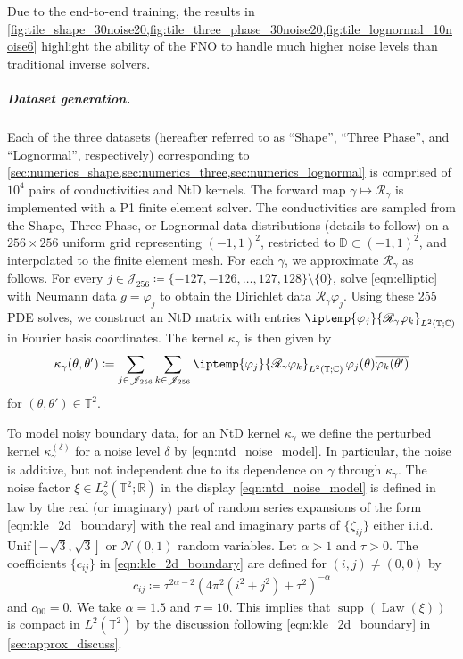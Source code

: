 \documentclass[pdflatex,sn-mathphys-num]{sn-jnl-preprint}
\newcommand{\R}{\mathbb{R}}
\newcommand{\T}{\mathbb{T}}
\newcommand{\C}{\mathbb{C}}
\newcommand{\D}{\mathbb{D}}
\newcommand{\sJ}{\mathscr{J}}
\newcommand{\ntd}{\mathscr{R}_{\gamma}}
\newcommand{\ip}{\iptemp}
\newcommand{\defeq}{\coloneqq} %
\newcommand{\Law}{\operatorname{Law}} %
\newcommand{\normal}{\mathcal{N}} %
\newcommand{\Unif}{\mathrm{Unif}}
\DeclareMathOperator{\supp}{supp} %
\newcommand{\al}{\alpha}
\theoremstyle{thmstyleone}%
\theoremstyle{thmstyletwo}%
\theoremstyle{thmstylethree}%
\numberwithin{equation}{section}
\numberwithin{theorem}{section}
\begin{document}
\begin{appendices}
Due to the end-to-end training, the results in \cref{fig:tile_shape_30noise20,fig:tile_three_phase_30noise20,fig:tile_lognormal_10noise6} highlight the ability of the FNO to handle much higher noise levels than traditional inverse solvers.

\subparagraph*{\emph{\textbf{Dataset generation.}}}
Each of the three datasets (hereafter referred to as ``Shape'', ``Three Phase'', and ``Lognormal'', respectively) corresponding to \cref{sec:numerics_shape,sec:numerics_three,sec:numerics_lognormal} is comprised of $10^4$ pairs of conductivities and NtD kernels. The forward map $\gamma\mapsto\ntd$ is implemented with a P1 finite element solver. The conductivities are sampled from the Shape, Three Phase, or Lognormal data distributions (details to follow) on a $256\times 256$ uniform grid representing $(-1,1)^2$, restricted to $\D\subset(-1,1)^2$, and interpolated to the finite element mesh. For each $\gamma$, we approximate $\ntd$ as follows. For every $j\in \sJ_{256}\defeq \{-127,-126,\ldots, 127, 128\}\setminus\{0\}$, solve \eqref{eqn:elliptic} with Neumann data $g=\varphi_j$ to obtain the Dirichlet data $\ntd\varphi_j$. Using these 255 PDE solves, we construct an NtD matrix with entries $\ip{\varphi_j}{\ntd\varphi_k}_{L^2(\T;\C)}$ in Fourier basis coordinates. The kernel $\kappa_\gamma$ is then given by
\begin{align}\label{eqn:app_kernel_from_matrix}
    \kappa_\gamma(\theta,\theta')\defeq \sum_{j\in\sJ_{256}}\sum_{k\in\sJ_{256}}\ip{\varphi_j}{\ntd\varphi_k}_{L^2(\T;\C)}\, \varphi_j(\theta)\overline{\varphi_k(\theta')}
\end{align}
for $(\theta,\theta')\in\T^2$. 

To model noisy boundary data, for an NtD kernel $\kappa_\gamma$ we define the perturbed kernel $\kappa_\gamma^{(\delta)}$ for a noise level $\delta$ by \eqref{eqn:ntd_noise_model}. In particular, the noise is additive, but not independent due to its dependence on $\gamma$ through $\kappa_\gamma$.
The noise factor $\xi\in L^2_\diamond(\T^2;\R)$ in the display \eqref{eqn:ntd_noise_model} is defined in law by the real (or imaginary) part of random series expansions of the form \eqref{eqn:kle_2d_boundary} with the real and imaginary parts of $\{\zeta_{ij}\}$ either i.i.d. $\Unif[-\sqrt{3},\sqrt{3}]$ or $\normal(0,1)$ random variables. Let $\al>1$ and $\tau>0$. The coefficients $\{c_{ij}\}$ in \eqref{eqn:kle_2d_boundary} are defined for $(i,j)\neq (0,0)$ by
\begin{align}
    c_{ij}\defeq \tau^{2\al-2}(4\pi^2(i^2+j^2)+\tau^2)^{-\al}
\end{align}
and $c_{00}=0$. We take $\al=1.5$ and $\tau=10$. This implies that $\supp(\Law(\xi))$ is compact in $L^2(\T^2)$ by the discussion following \eqref{eqn:kle_2d_boundary} in \cref{sec:approx_discuss}. 


\end{appendices}
\end{document}
